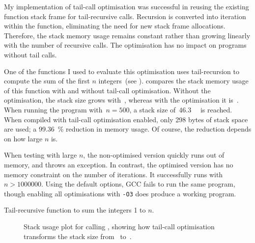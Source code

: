 \documentclass[00-main.tex]{subfiles}
\begin{document}
My implementation of tail-call optimisation was successful in reusing the existing function stack frame for tail-recursive calls.
Recursion is converted into iteration within the function, eliminating the need for new stack frame allocations.
Therefore, the stack memory usage remains constant rather than growing linearly with the number of recursive calls.
The optimisation has no impact on programs without tail calls.

One of the functions I used to evaluate this optimisation uses tail-recursion to compute the sum of the first $n$ integers~(see ).
 compares the stack memory usage of this function with and without tail-call optimisation.
Without the optimisation, the stack size grows with~, whereas with the optimisation it is~.
When running the program with~$n=500$, a stack size of~\SI{46.3}{\kilo\byte} is reached.
When compiled with tail-call optimisation enabled, only 298 bytes of stack space are used; a \SI{99.36}{\percent} reduction in memory usage.
Of course, the reduction depends on how large $n$ is.

When testing with large $n$, the non-optimised version quickly runs out of memory, and throws an exception.
In contrast, the optimised version has no memory constraint on the number of iterations.
It successfully runs with $n > \num{1000000}$.
Using the default options, GCC fails to run the same program, though enabling all optimisations with \texttt{-O3} does produce a working program.

\begin{listing}[t]
\caption{Tail-recursive function to sum the integers 1 to $n$.\bigskip}
\label{lst:tail-recursive sum}
\end{listing}

\begin{figure}[t]
  \centering
  \caption{
    Stack usage plot for calling , showing how tail-call optimisation transforms the stack size from~ to~.
  }
  \label{fig:tail-call optimisation stack use} %
\end{figure}
\end{document}
